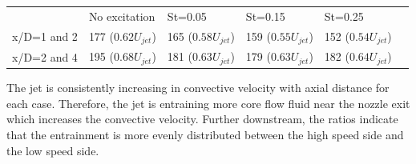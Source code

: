 \documentclass[english]{aiaa-tc}
\begin{document}
\begin{center}
	\begin{tabular}{|l|l|l|l|l|l}
		 & No excitation & St=0.05 & St=0.15 & St=0.25 \\
		x/D=1 and 2 & 177 ($0.62U_{jet}$) & 165 ($0.58U_{jet}$) & 159 ($0.55U_{jet}$) & 152 ($0.54U_{jet}$) \\
		x/D=2 and 4 & 195 ($0.68U_{jet}$) & 181 ($0.63U_{jet}$) & 179 ($0.63U_{jet}$) & 182 ($0.64U_{jet}$) \\
	\end{tabular}
	\label{tab:nearnozzleconvec}
\end{center}
The jet is consistently increasing in convective velocity with axial distance for each case.
Therefore, the jet is entraining more core flow fluid near the nozzle exit which increases the convective velocity. Further downstream, the ratios indicate that the entrainment is more evenly distributed between the high speed side and the low speed side.

\end{document}
